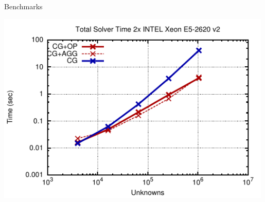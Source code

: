 \begin{frame}{Benchmarks}
  \begin{center}
   \includegraphics[width=0.99\textwidth]{figures/cpu-full.pdf}
  \end{center}
\end{frame}


